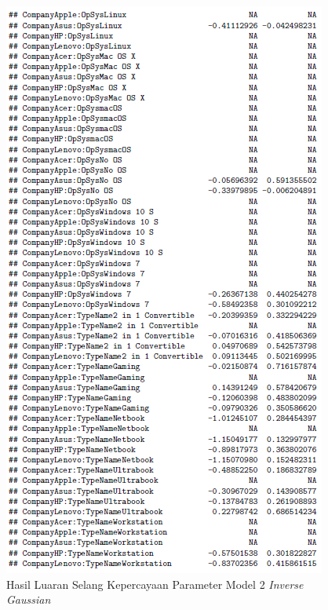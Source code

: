 \documentclass[12pt]{article}
\begin{document}
\begin{figure}[h!]
    \centering
    \includegraphics{Model_4_CI(2_5).png}
    \caption{Hasil Luaran Selang Kepercayaan Parameter Model 2 \textit{Inverse Gaussian}}
    \label{fig:CI42}
\end{figure}
\end{document}
